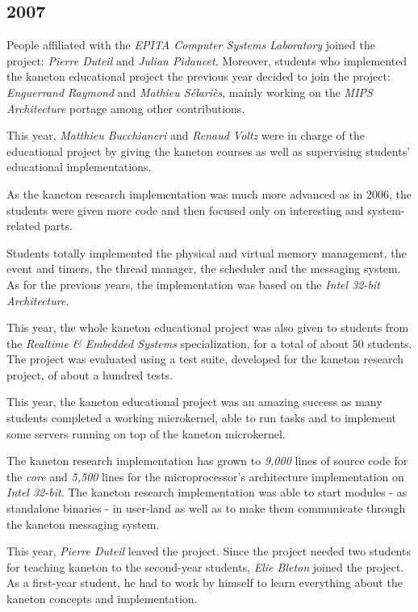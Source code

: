 \begin{multicols}{2}
%
%

\subsection{2007}

People affiliated with the \textit{EPITA Computer Systems Laboratory} joined
the project: \textit{Pierre Duteil} and \textit{Julian Pidancet}. Moreover,
students who implemented the kaneton educational project the previous year
decided to join the project: \textit{Enguerrand Raymond} and \textit{Mathieu
S\'elari\`es}, mainly working on the \textit{MIPS Architecture} portage among
other contributions.

This year, \textit{Matthieu Bucchianeri} and \textit{Renaud Voltz} were in
charge of the educational project by giving the kaneton courses as well
as supervising students' educational implementations.

As the kaneton research implementation was much more advanced as in 2006,
the students were given more code and then focused only on interesting and
system-related parts.

Students totally implemented the physical and virtual memory management, the
event and timers, the thread manager, the scheduler and the messaging system.
As for the previous years, the implementation was based on the \textit{Intel
32-bit Architecture}.

This year, the whole kaneton educational project was also given to students
from the \textit{Realtime \& Embedded Systems} specialization, for a total
of about $50$ students. The project was evaluated using a test suite,
developed for the kaneton research project, of about a hundred tests.

This year, the kaneton educational project was an amazing success as many
students completed a working microkernel, able to run tasks and to implement
some servers running on top of the kaneton microkernel.

The kaneton research implementation has grown to \textit{9,000} lines of source
code for the \textit{core} and \textit{5,500} lines for the microprocessor's
architecture implementation on \textit{Intel 32-bit}. The kaneton research
implementation was able to start modules - as standalone binaries - in
user-land as well as to make them communicate through the kaneton messaging
system.

This year, \textit{Pierre Duteil} leaved the project. Since the project
needed two students for teaching kaneton to the second-year students,
\textit{Elie Bleton} joined the project. As a first-year student, he had
to work by himself to learn everything about the kaneton concepts and
implementation.


\end{multicols}
